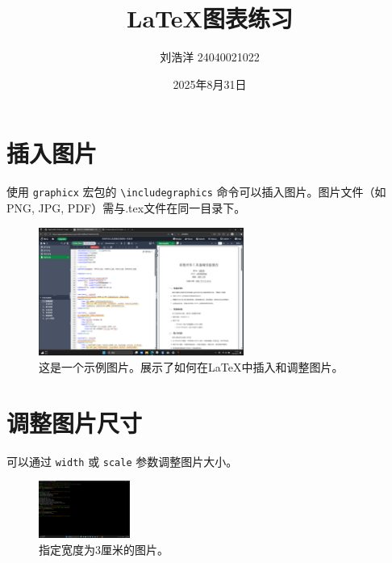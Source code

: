 \documentclass{article}
\title{LaTeX图表练习}
\author{刘浩洋 24040021022}
\date{2025年8月31日}
\begin{document}
\maketitle

\section{插入图片}
使用 \texttt{graphicx} 宏包的 \texttt{\textbackslash includegraphics} 命令可以插入图片。图片文件（如PNG, JPG, PDF）需与.tex文件在同一目录下。

\begin{figure}[htbp]
    \centering %
    \includegraphics[width=0.6\textwidth]{example-image.png} %
    \caption{这是一个示例图片。展示了如何在LaTeX中插入和调整图片。}
    \label{fig:example}
\end{figure}

\section{调整图片尺寸}
可以通过 \texttt{width} 或 \texttt{scale} 参数调整图片大小。

\begin{figure}[h]
    \centering
    \includegraphics[width=3cm]{example-image-a.png} %
    \caption{指定宽度为3厘米的图片。}
    \label{fig:width}
\end{figure}
\end{document}
